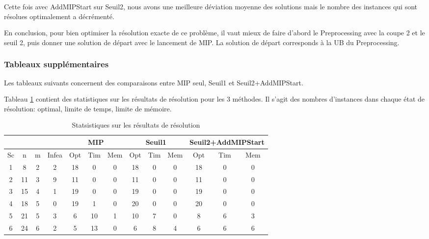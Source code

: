 \documentclass[twoside,fleqn]{EPURapport}
\begin{document}
Cette fois avec AddMIPStart sur Seuil2, nous avons une meilleure déviation moyenne des solutions mais le nombre des instances qui sont résolues optimalement a décrémenté. 

En conclusion, pour bien optimiser la résolution exacte de ce problème, il vaut mieux de faire d'abord le Preprocessing avec la coupe 2 et le seuil 2, puis donner une solution de départ avec le lancement de MIP. La solution de départ corresponds à la UB du Preprocessing.




\subsubsection{Tableaux supplémentaires}


Les tableaux suivants concernent des comparaisons entre MIP seul, Seuil1 et Seuil2+AddMIPStart.



Tableau \ref{tab_mip_s1_ams2_stats} contient des statistiques sur les résultats de résolution pour les 3 méthodes. Il s'agit des nombres d'instances dans chaque état de résolution: optimal, limite de temps, limite de mémoire. 
\begin{table}[h]
    \centering
\begin{tabular}{|c|c|c|c|c|c|c|c|c|c|c|c|c|} 
\hline
&&&&\multicolumn{3}{c|}{MIP} &\multicolumn{3}{c|}{Seuil1}&\multicolumn{3}{c|}{Seuil2+AddMIPStart}  \\ \hline
Sc&n&m & Infea & Opt	& Tim & Mem  & Opt	& Tim & Mem   & Opt	& Tim & Mem \\ \hline
1&  	8	&2	& 2 & 18 & 0 & 0 & 18	& 0	& 0&18	&0	&0\\ \hline
2& 	    11	&3	& 9 & 11 & 0 & 0 & 11	& 0	& 0&11	&0	&0\\ \hline
3&  	15	&4	& 1 & 19 & 0 & 0 & 19	& 0	& 0&19	&0	&0\\ \hline
4&		18	&5	& 0 & 19 & 1 & 0 & 20	&0	&0&	20	&0	&0\\ \hline
5&		21	&5	& 3 & 6 &  10 & 1 &10	&7	&0&	8	&6	&3\\ \hline
6&		24	&6	& 2 & 5 &  13 & 0 &6	&8	&4&	6	&6	&6\\ \hline  
\end{tabular}
\caption{Statsistiques sur les résultats de résolution}
    \label{tab_mip_s1_ams2_stats}
\end{table}
\bigskip
\end{document}
